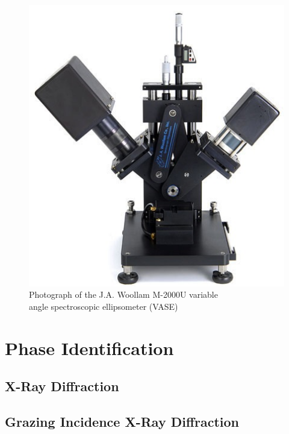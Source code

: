 \begin{figure}[tb]
   \centering
   \includegraphics[width=0.66\linewidth]{./figures/characterization/M2000_ellipsometer_image.png} 
   \caption[J.A. Woollam M-2000U Ellipsometer]%
   		{Photograph of the J.A. Woollam M-2000U variable \\%
   		 angle spectroscopic ellipsometer (VASE)}
   \label{fig:M2000_image}
\end{figure}


	
\section{Phase Identification}


\subsection{X-Ray Diffraction}

\lipsum	


\subsection{Grazing Incidence X-Ray Diffraction}

\lipsum


